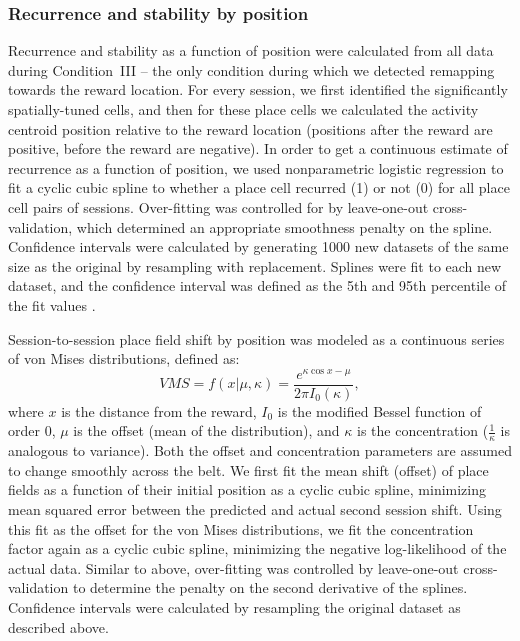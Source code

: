 \subsubsection{Recurrence and stability by position}
Recurrence and stability as a function of position were calculated from all data during Condition~III -- the only condition during which we detected remapping towards the reward location. For every session, we first identified the significantly spatially-tuned cells, and then for these place cells we calculated the activity centroid position relative to the reward location (positions after the reward are positive, before the reward are negative). In order to get a continuous estimate of recurrence as a function of position, we used nonparametric logistic regression to fit a cyclic cubic spline to whether a place cell recurred (1) or not (0) for all place cell pairs of sessions. Over-fitting was controlled for by leave-one-out cross-validation, which determined an appropriate smoothness penalty on the spline. Confidence intervals were calculated by generating 1000 new datasets of the same size as the original by resampling with replacement. Splines were fit to each new dataset, and the confidence interval was defined as the 5th and 95th percentile of the fit values \citep{Wang1995, Hastie2009}.

Session-to-session place field shift by position was modeled as a continuous series of von Mises distributions, defined as:
$$VMS = f(x|\mu,\kappa) = \frac{e^{\kappa\cos x-\mu }}{2\pi I_0(\kappa)},$$
where $x$ is the distance from the reward, $I_0$ is the modified Bessel function of order 0, $\mu$ is the offset (mean of the distribution), and $\kappa$ is the concentration ($\frac{1}{\kappa}$ is analogous to variance). Both the offset and concentration parameters are assumed to change smoothly across the belt. We first fit the mean shift (offset) of place fields as a function of their initial position as a cyclic cubic spline, minimizing mean squared error between the predicted and actual second session shift. Using this fit as the offset for the von Mises distributions, we fit the concentration factor again as a cyclic cubic spline, minimizing the negative log-likelihood of the actual data. Similar to above, over-fitting was controlled by leave-one-out cross-validation to determine the penalty on the second derivative of the splines. Confidence intervals were calculated by resampling the original dataset as described above.

